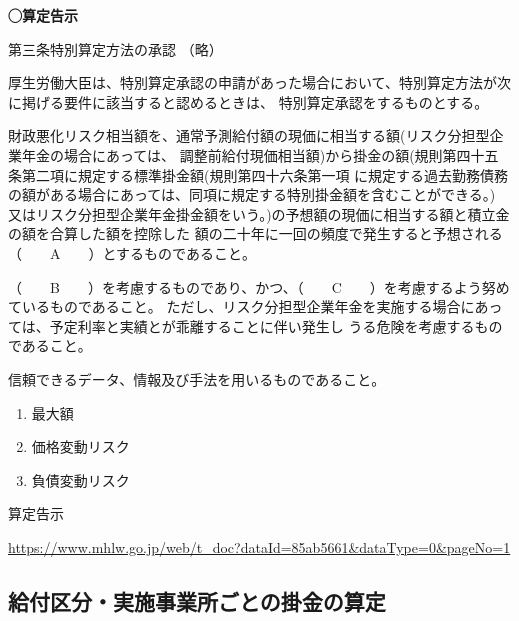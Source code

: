 \begin{fillblank}[]
  \noindent \textbf{◯算定告示}
  \begin{lawstructure}
    \begin{lawarticle}{第三条}{特別算定方法の承認}
      （略）

      厚生労働大臣は、特別算定承認の申請があった場合において、特別算定方法が次に掲げる要件に該当すると認めるときは、
      特別算定承認をするものとする。

      財政悪化リスク相当額を、通常予測給付額の現価に相当する額(リスク分担型企業年金の場合にあっては、
      調整前給付現価相当額)から掛金の額(規則第四十五条第二項に規定する標準掛金額(規則第四十六条第一項
      に規定する過去勤務債務の額がある場合にあっては、同項に規定する特別掛金額を含むことができる。)
      又はリスク分担型企業年金掛金額をいう。)の予想額の現価に相当する額と積立金の額を合算した額を控除した
      額の二十年に一回の頻度で発生すると予想される（　　A　　）とするものであること。

      （　　B　　）を考慮するものであり、かつ、（　　C　　）を考慮するよう努めているものであること。
      ただし、リスク分担型企業年金を実施する場合にあっては、予定利率と実績とが乖離することに伴い発生し
      うる危険を考慮するものであること。

      信頼できるデータ、情報及び手法を用いるものであること。
    \end{lawarticle}
  \end{lawstructure}
\end{fillblank}

\begin{answerbox}
  \begin{enumerate}[A: ]
    \item 最大額
    \item 価格変動リスク
    \item 負債変動リスク
  \end{enumerate}
\end{answerbox}

\begin{explanationbox}
  算定告示

  \url{https://www.mhlw.go.jp/web/t_doc?dataId=85ab5661&dataType=0&pageNo=1}
\end{explanationbox}

\newpage

\subsection{給付区分・実施事業所ごとの掛金の算定}


